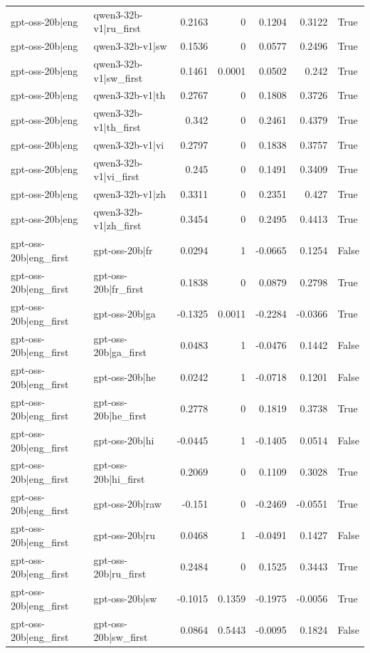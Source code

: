 \begin{table}
\begin{tabular}{l l r r r r l}
gpt-oss-20b|eng & qwen3-32b-v1|ru_first & 0.2163 & 0 & 0.1204 & 0.3122 & True \\
gpt-oss-20b|eng & qwen3-32b-v1|sw & 0.1536 & 0 & 0.0577 & 0.2496 & True \\
gpt-oss-20b|eng & qwen3-32b-v1|sw_first & 0.1461 & 0.0001 & 0.0502 & 0.242 & True \\
gpt-oss-20b|eng & qwen3-32b-v1|th & 0.2767 & 0 & 0.1808 & 0.3726 & True \\
gpt-oss-20b|eng & qwen3-32b-v1|th_first & 0.342 & 0 & 0.2461 & 0.4379 & True \\
gpt-oss-20b|eng & qwen3-32b-v1|vi & 0.2797 & 0 & 0.1838 & 0.3757 & True \\
gpt-oss-20b|eng & qwen3-32b-v1|vi_first & 0.245 & 0 & 0.1491 & 0.3409 & True \\
gpt-oss-20b|eng & qwen3-32b-v1|zh & 0.3311 & 0 & 0.2351 & 0.427 & True \\
gpt-oss-20b|eng & qwen3-32b-v1|zh_first & 0.3454 & 0 & 0.2495 & 0.4413 & True \\
gpt-oss-20b|eng_first & gpt-oss-20b|fr & 0.0294 & 1 & -0.0665 & 0.1254 & False \\
gpt-oss-20b|eng_first & gpt-oss-20b|fr_first & 0.1838 & 0 & 0.0879 & 0.2798 & True \\
gpt-oss-20b|eng_first & gpt-oss-20b|ga & -0.1325 & 0.0011 & -0.2284 & -0.0366 & True \\
gpt-oss-20b|eng_first & gpt-oss-20b|ga_first & 0.0483 & 1 & -0.0476 & 0.1442 & False \\
gpt-oss-20b|eng_first & gpt-oss-20b|he & 0.0242 & 1 & -0.0718 & 0.1201 & False \\
gpt-oss-20b|eng_first & gpt-oss-20b|he_first & 0.2778 & 0 & 0.1819 & 0.3738 & True \\
gpt-oss-20b|eng_first & gpt-oss-20b|hi & -0.0445 & 1 & -0.1405 & 0.0514 & False \\
gpt-oss-20b|eng_first & gpt-oss-20b|hi_first & 0.2069 & 0 & 0.1109 & 0.3028 & True \\
gpt-oss-20b|eng_first & gpt-oss-20b|raw & -0.151 & 0 & -0.2469 & -0.0551 & True \\
gpt-oss-20b|eng_first & gpt-oss-20b|ru & 0.0468 & 1 & -0.0491 & 0.1427 & False \\
gpt-oss-20b|eng_first & gpt-oss-20b|ru_first & 0.2484 & 0 & 0.1525 & 0.3443 & True \\
gpt-oss-20b|eng_first & gpt-oss-20b|sw & -0.1015 & 0.1359 & -0.1975 & -0.0056 & True \\
gpt-oss-20b|eng_first & gpt-oss-20b|sw_first & 0.0864 & 0.5443 & -0.0095 & 0.1824 & False \\

\end{tabular}
\end{table}
